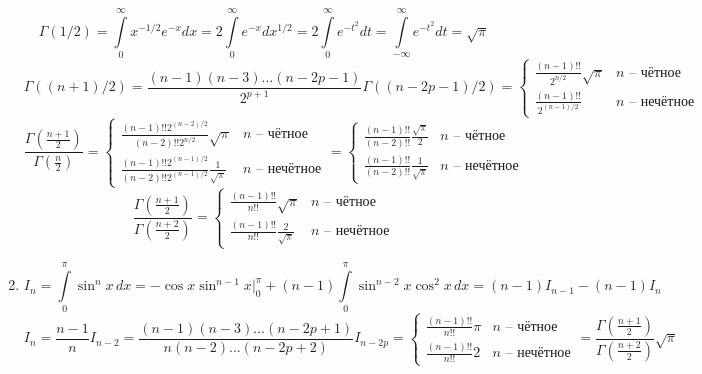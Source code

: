 \begin{enumerate}
	\[
		\Gamma(1/2) = \int\limits_0^\infty x^{-1/2} e^{-x} dx = 2 \int\limits_0^\infty e^{-x} dx^{1/2} =
		2 \int\limits_0^\infty e^{-t^2} dt = \int\limits_{-\infty}^\infty e^{-t^2} dt = \sqrt{\pi}
	\]
	\[
		\Gamma((n + 1)/2) = \frac{(n - 1)(n - 3)...(n - 2p - 1)}{2^{p+1}} \Gamma((n - 2p - 1)/2) =
		\begin{cases}
		\frac{(n - 1)!!}{2^{n/2}} \sqrt{\pi} & \text{$n$ -- чётное} \\
		\frac{(n - 1)!!}{2^{(n - 1)/2}} & \text{$n$ -- нечётное}
		\end{cases} 
	\]
	\[
		\frac{\Gamma\left(\frac{n + 1}{2}\right)}{\Gamma\left(\frac{n}{2}\right)}
		=
		\begin{cases}
		\frac{(n - 1)!! 2^{(n - 2)/2}}{(n - 2)!! 2^{n/2}} \sqrt{\pi} & \text{$n$ -- чётное} \\
		\frac{(n - 1)!! 2^{(n - 1)/2}}{(n - 2)!! 2^{(n - 1)/2}} \frac{1}{\sqrt{\pi}} & \text{$n$ -- нечётное}
		\end{cases}
		=
		\begin{cases}
		\frac{(n - 1)!!}{(n - 2)!!} \frac{\sqrt{\pi}}{2} & \text{$n$ -- чётное} \\
		\frac{(n - 1)!!}{(n - 2)!!} \frac{1}{\sqrt{\pi}} & \text{$n$ -- нечётное}
		\end{cases}
	\]
	\[
		\frac{\Gamma\left(\frac{n + 1}{2}\right)}{\Gamma\left(\frac{n + 2}{2}\right)}
		=
		\begin{cases}
		\frac{(n - 1)!!}{n!!} \sqrt{\pi} & \text{$n$ -- чётное} \\
		\frac{(n - 1)!!}{n!!} \frac{2}{\sqrt{\pi}} & \text{$n$ -- нечётное}
		\end{cases}
	\]
	\item
	\[
		I_n = \int\limits_0^\pi \sin^n x \, dx = - \cos x \sin^{n - 1} x \Big|_0^\pi + (n - 1) \int\limits_0^\pi \sin^{n - 2} x \cos^2 x \, dx = 
		(n - 1) I_{n - 1} - (n - 1) I_n 
	\] 
	\[
		I_n = \frac{n - 1}{n} I_{n - 2} = \frac{(n - 1)(n - 3)...(n - 2p +  1)}{n(n - 2)...(n - 2p + 2)} I_{n - 2p} =
		\begin{cases}
		\frac{(n - 1)!!}{n!!} \pi  & \text{$n$ -- чётное}\\
		\frac{(n - 1)!!}{n!!} 2 & \text{$n$ -- нечётное}
		\end{cases}
		=
		\frac{\Gamma\left(\frac{n + 1}{2}\right)}{\Gamma\left(\frac{n + 2}{2}\right)} \sqrt{\pi}
	\]
\end{enumerate}
